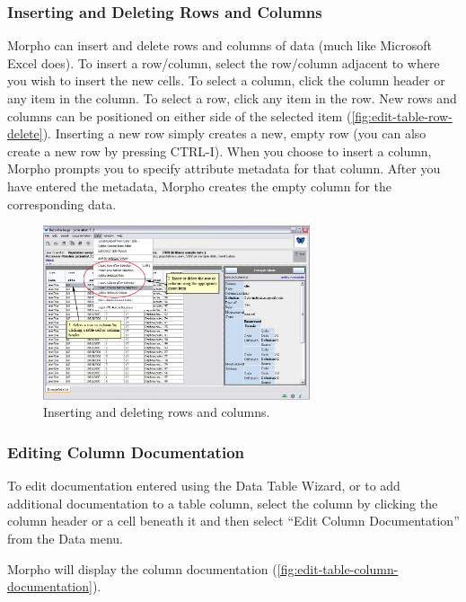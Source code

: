 \subsubsection{Inserting and Deleting Rows and Columns}
\label{sec:edit-table-rowcol}

Morpho can insert and delete rows and columns of data (much like
Microsoft Excel does). To insert a row/column, select the row/column
adjacent to where you wish to insert the new cells. To select a column,
click the column header or any item in the column. To select a row,
click any item in the row. New rows and columns can be positioned on
either side of the selected item (\autoref{fig:edit-table-row-delete}).
Inserting a new row simply creates a new, empty row (you can also create
a new row by pressing CTRL-I). When you choose to insert a column,
Morpho prompts you to specify attribute metadata for that column. After
you have entered the metadata, Morpho creates the empty column for the
corresponding data.

\begin{figure}
  \centering
    \includegraphics[width=0.7\textwidth]{images/edit-table-row-delete}
  \caption{Inserting and deleting rows and columns.}
  \label{fig:edit-table-row-delete}
\end{figure}

\subsubsection{Editing Column Documentation}
\label{sec:edit-table-col-doc}

To edit documentation entered using the Data Table Wizard, or to add
additional documentation to a table column, select the column by
clicking the column header or a cell beneath it and then select ``Edit
Column Documentation'' from the Data menu. 

Morpho will display the column documentation
(\autoref{fig:edit-table-column-documentation}).  

